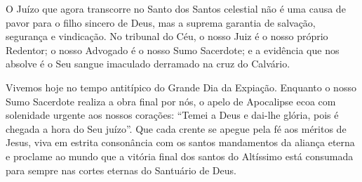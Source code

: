 O Juízo que agora transcorre no Santo dos Santos celestial não é uma causa de pavor para o filho sincero de Deus, mas a suprema garantia de salvação, segurança e vindicação. No tribunal do Céu, o nosso Juiz é o nosso próprio Redentor; o nosso Advogado é o nosso Sumo Sacerdote; e a evidência que nos absolve é o Seu sangue imaculado derramado na cruz do Calvário.

Vivemos hoje no tempo antitípico do Grande Dia da Expiação. Enquanto o nosso Sumo Sacerdote realiza a obra final por nós, o apelo de Apocalipse ecoa com solenidade urgente aos nossos corações: ``Temei a Deus e dai-lhe glória, pois é chegada a hora do Seu juízo''. Que cada crente se apegue pela fé aos méritos de Jesus, viva em estrita consonância com os santos mandamentos da aliança eterna e proclame ao mundo que a vitória final dos santos do Altíssimo está consumada para sempre nas cortes eternas do Santuário de Deus.